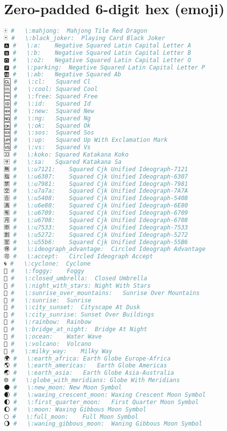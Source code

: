 \section{Zero-padded 6-digit hex (emoji)}
\begin{lstlisting}[language=Julia, style=julia]
🀄 #   \:mahjong:  Mahjong Tile Red Dragon
🃏 #   \:black_joker:  Playing Card Black Joker
🅰 #   \:a:    Negative Squared Latin Capital Letter A
🅱 #   \:b:    Negative Squared Latin Capital Letter B
🅾 #   \:o2:   Negative Squared Latin Capital Letter O
🅿 #   \:parking:  Negative Squared Latin Capital Letter P
🆎 #   \:ab:   Negative Squared Ab
🆑 #   \:cl:   Squared Cl
🆒 #   \:cool: Squared Cool
🆓 #   \:free: Squared Free
🆔 #   \:id:   Squared Id
🆕 #   \:new:  Squared New
🆖 #   \:ng:   Squared Ng
🆗 #   \:ok:   Squared Ok
🆘 #   \:sos:  Squared Sos
🆙 #   \:up:   Squared Up With Exclamation Mark
🆚 #   \:vs:   Squared Vs
🈁 #   \:koko: Squared Katakana Koko
🈂 #   \:sa:   Squared Katakana Sa
🈚 #   \:u7121:    Squared Cjk Unified Ideograph-7121
🈯 #   \:u6307:    Squared Cjk Unified Ideograph-6307
🈲 #   \:u7981:    Squared Cjk Unified Ideograph-7981
🈳 #   \:u7a7a:    Squared Cjk Unified Ideograph-7A7A
🈴 #   \:u5408:    Squared Cjk Unified Ideograph-5408
🈵 #   \:u6e80:    Squared Cjk Unified Ideograph-6E80
🈶 #   \:u6709:    Squared Cjk Unified Ideograph-6709
🈷 #   \:u6708:    Squared Cjk Unified Ideograph-6708
🈸 #   \:u7533:    Squared Cjk Unified Ideograph-7533
🈹 #   \:u5272:    Squared Cjk Unified Ideograph-5272
🈺 #   \:u55b6:    Squared Cjk Unified Ideograph-55B6
🉐 #   \:ideograph_advantage:  Circled Ideograph Advantage
🉑 #   \:accept:   Circled Ideograph Accept
🌀 #   \:cyclone:  Cyclone
🌁 #   \:foggy:    Foggy
🌂 #   \:closed_umbrella:  Closed Umbrella
🌃 #   \:night_with_stars: Night With Stars
🌄 #   \:sunrise_over_mountains:   Sunrise Over Mountains
🌅 #   \:sunrise:  Sunrise
🌆 #   \:city_sunset:  Cityscape At Dusk
🌇 #   \:city_sunrise: Sunset Over Buildings
🌈 #   \:rainbow:  Rainbow
🌉 #   \:bridge_at_night:  Bridge At Night
🌊 #   \:ocean:    Water Wave
🌋 #   \:volcano:  Volcano
🌌 #   \:milky_way:    Milky Way
🌍 #   \:earth_africa: Earth Globe Europe-Africa
🌎 #   \:earth_americas:   Earth Globe Americas
🌏 #   \:earth_asia:   Earth Globe Asia-Australia
🌐 #   \:globe_with_meridians: Globe With Meridians
🌑 #   \:new_moon: New Moon Symbol
🌒 #   \:waxing_crescent_moon: Waxing Crescent Moon Symbol
🌓 #   \:first_quarter_moon:   First Quarter Moon Symbol
🌔 #   \:moon: Waxing Gibbous Moon Symbol
🌕 #   \:full_moon:    Full Moon Symbol
🌖 #   \:waning_gibbous_moon:  Waning Gibbous Moon Symbol

\end{lstlisting}
